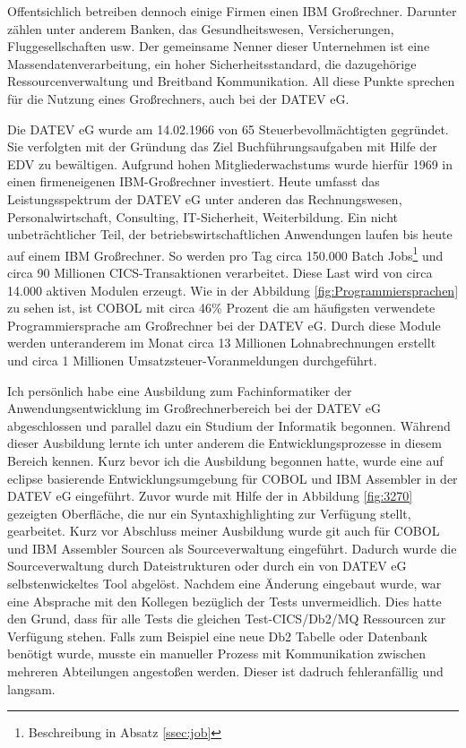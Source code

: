 Offentsichlich betreiben dennoch einige Firmen einen IBM Großrechner.
Darunter zählen unter anderem Banken, das Gesundheitswesen, Versicherungen, Fluggesellschaften usw.
Der gemeinsame Nenner dieser Unternehmen ist eine Massendatenverarbeitung, ein hoher Sicherheitsstandard, die dazugehörige Ressourcenverwaltung und Breitband Kommunikation.
All diese Punkte sprechen für die Nutzung eines Großrechners, auch bei der DATEV eG.
\cite{IBM.2014}

Die DATEV eG wurde am 14.02.1966 von 65 Steuerbevollmächtigten gegründet.
Sie verfolgten mit der Gründung das Ziel Buchführungsaufgaben mit Hilfe der EDV zu bewältigen.
Aufgrund hohen Mitgliederwachstums wurde hierfür 1969 in einen firmeneigenen IBM-Großrechner investiert.\cite{DATEVeG.2017}
Heute umfasst das Leistungsspektrum der DATEV eG unter anderen das Rechnungswesen, Personalwirtschaft, Consulting, IT-Sicherheit, Weiterbildung.
Ein nicht unbeträchtlicher Teil, der betriebswirtschaftlichen Anwendungen laufen bis heute auf einem IBM Großrechner.
So werden pro Tag circa 150.000 Batch Jobs\footnote{Beschreibung in Absatz \ref{ssec:job}} und circa 90 Millionen CICS-Transaktionen verarbeitet.
Diese Last wird von circa 14.000 aktiven Modulen erzeugt.
Wie in der Abbildung \ref{fig:Programmiersprachen} zu sehen ist, ist COBOL mit circa 46\% Prozent die am häufigsten verwendete Programmiersprache am Großrechner bei der DATEV eG.
Durch diese Module werden unteranderem im Monat circa 13 Millionen Lohnabrechnungen erstellt und circa 1 Millionen Umsatzsteuer-Voranmeldungen durchgeführt.

Ich persönlich habe eine Ausbildung zum Fachinformatiker der Anwendungsentwicklung im Großrechnerbereich bei der DATEV eG abgeschlossen und parallel dazu ein Studium der Informatik begonnen.
Während dieser Ausbildung lernte ich unter anderem die Entwicklungsprozesse in diesem Bereich kennen.
Kurz bevor ich die Ausbildung begonnen hatte, wurde eine auf eclipse basierende Entwicklungsumgebung für COBOL und IBM Assembler in der DATEV eG eingeführt.
Zuvor wurde mit Hilfe der in Abbildung \ref{fig:3270} gezeigten Oberfläche, die nur ein Syntaxhighlighting zur Verfügung stellt, gearbeitet.
Kurz vor Abschluss meiner Ausbildung wurde git auch für COBOL und IBM Assembler Sourcen als Sourceverwaltung eingeführt.
Dadurch wurde die Sourceverwaltung durch Dateistrukturen oder durch ein von DATEV eG selbstenwickeltes Tool abgelöst.
Nachdem eine Änderung eingebaut wurde, war eine Absprache mit den Kollegen bezüglich der Tests unvermeidlich.
Dies hatte den Grund, dass für alle Tests die gleichen Test-CICS/Db2/MQ Ressourcen zur Verfügung stehen.
Falls zum Beispiel eine neue Db2 Tabelle oder Datenbank benötigt wurde, musste ein manueller Prozess mit Kommunikation zwischen mehreren Abteilungen angestoßen werden.
Dieser ist dadruch fehleranfällig und langsam.


